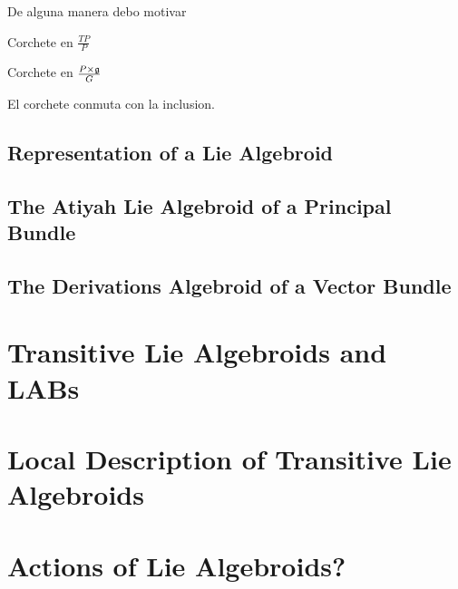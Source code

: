 De alguna manera debo motivar 

\begin{definition}
Corchete en $\frac{TP}{P}$
\end{definition}

\begin{definition}
Corchete en $\frac{P \times \mathfrak{g}}{G}$
\end{definition}

\begin{proposition}
El corchete conmuta con la inclusion.
\end{proposition}




\subsection{Representation of a Lie Algebroid}

\subsection{The Atiyah Lie Algebroid of a Principal Bundle}

\subsection{The Derivations Algebroid of a Vector Bundle}

\section{Transitive Lie Algebroids and LABs}

\section{Local Description of Transitive Lie Algebroids}

\section{Actions of Lie Algebroids?}